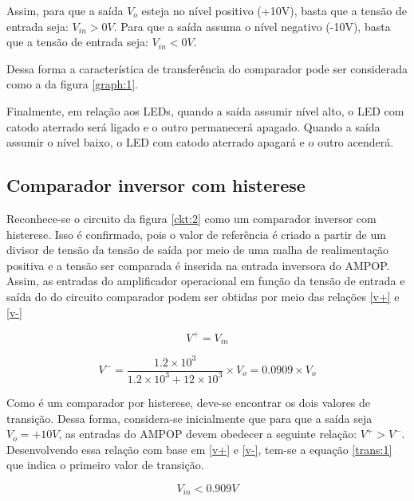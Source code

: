 Assim, para que a saída $V_o$ esteja no nível positivo (+10V), basta que a tensão de entrada seja: $V_{in}>0V$. Para que a saída assuma o nível negativo (-10V), basta que a tensão de entrada seja: $V_{in}<0V$.

Dessa forma a característica de transferência do comparador pode ser considerada como a da figura \ref{graph:1}.



Finalmente, em relação aos LEDs, quando a saída assumir nível alto, o LED com catodo aterrado será ligado e o outro permanecerá apagado. Quando a saída assumir o nível baixo, o LED com catodo aterrado apagará e o outro acenderá.

\subsection{Comparador inversor com histerese}

Reconhece-se o circuito da figura \ref{ckt:2} como um comparador inversor com histerese. Isso é confirmado, pois o valor de referência é criado a partir de um divisor de tensão da tensão de saída por meio de uma malha de realimentação positiva e a tensão ser comparada é inserida na entrada inversora do AMPOP. Assim, as entradas do amplificador operacional em função da tensão de entrada e saída do do circuito comparador podem ser obtidas por meio das relações \ref{v+} e \ref{v-}

\begin{center}
\begin{equation} \label{v+}
       V^+ = V_{in}
\end{equation}
\end{center}

\begin{center}
\begin{equation} \label{v-}
       V^- = \frac{1.2 \times 10^3}{1.2 \times 10^3 + 12 \times 10^3} \times V_o = 0.0909 \times V_o
\end{equation}
\end{center}

Como é um comparador por histerese, deve-se encontrar os dois valores de transição. Dessa forma, considera-se inicialmente que para que a saída seja $V_o=+10V$, as entradas do AMPOP devem obedecer a seguinte relação: $V^+>V^-$. Desenvolvendo essa relação com base em \ref{v+} e \ref{v-}, tem-se a equação \ref{trans:1} que indica o primeiro valor de transição.

\begin{center}
\begin{equation} \label{trans:1}
       V_{in}<0.909 V
\end{equation}
\end{center}

